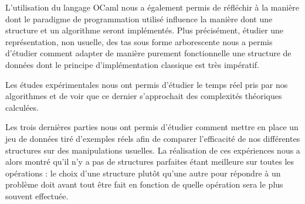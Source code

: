 \documentclass[12pt,a4paper]{article}
\begin{document}
L'utilisation du langage OCaml nous a également permis de réfléchir à la manière dont le paradigme de programmation utilisé influence la manière dont une structure et un algorithme seront implémentés.  Plus précisément, étudier une représentation, non usuelle, des tas sous forme arborescente nous a permis d'étudier comment adapter de manière purement fonctionnelle une structure de données dont le principe d'implémentation classique est très impératif.

Les études expérimentales nous ont permis d'étudier le temps réel pris par nos algorithmes et de voir que ce dernier s'approchait des complexités théoriques calculées.

Les trois dernières parties nous ont permis d'étudier comment mettre en place un jeu de données tiré d'exemples réels afin de comparer l'efficacité de nos différentes structures sur des manipulations usuelles. La réalisation de ces expériences nous a alors montré qu'il n'y a pas de structures parfaites étant meilleure sur toutes les opérations : le choix d'une structure plutôt qu'une autre pour répondre à un problème doit avant tout être fait en fonction de quelle opération sera le plus souvent effectuée. 



\cleardoublepage



\end{document}
